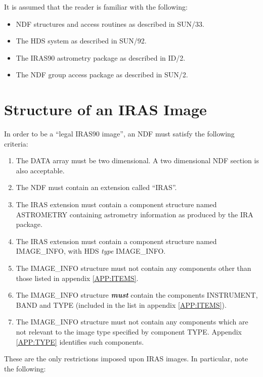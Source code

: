 It is assumed that the reader is familiar with the following:
\begin{itemize}
\item NDF structures and access routines as described in SUN/33.
\item The HDS system as described in SUN/92.
\item The IRAS90 astrometry package as described in ID/2.
\item The NDF group access package as described in SUN/2.
\end{itemize}

\section{Structure of an IRAS Image}
In order to be a ``legal IRAS90 image'', an NDF must satisfy the following
criteria:

\begin{enumerate}

\item The DATA array must be two dimensional. A two dimensional NDF section is
also acceptable.

\item The NDF must contain an extension called ``IRAS''.

\item The IRAS extension must contain a component structure named ASTROMETRY
containing astrometry information as produced by the IRA package.

\item The IRAS extension must contain a component structure named IMAGE\_INFO,
with HDS {\em type} IMAGE\_INFO.

\item The IMAGE\_INFO structure must not contain any components other than those
listed in appendix \ref{APP:ITEMS}.

\item The IMAGE\_INFO structure {\bf {\em must} } contain the components
INSTRUMENT, BAND and TYPE (included in the list in appendix \ref{APP:ITEMS}).

\item The IMAGE\_INFO structure must not contain any components which are not
relevant to the image type specified by component TYPE. Appendix \ref{APP:TYPE}
identifies such components.
\end{enumerate}

These are the only restrictions imposed upon IRAS images. In particular,
note the following:

